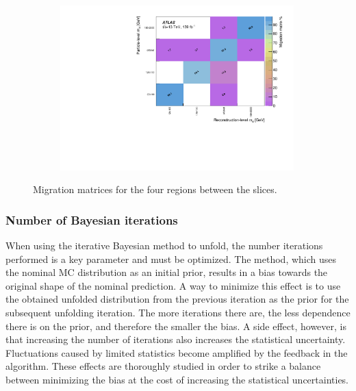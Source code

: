 \begin{figure}[tbh!]
  \centering
  \begin{subfigure}{.85\textwidth}\centering\includegraphics[width = 0.99\textwidth]{Figures/m4l/UnfoldingStudies/v014_matrices/inclusive_vs_m4lMatrix.pdf}\end{subfigure}
 \caption{Migration matrices for the four \mFourL{} regions between the slices. \label{fig:inclvm4lmat}}
\end{figure}

\subsubsection{Number of Bayesian iterations}

When using the iterative Bayesian method to unfold, the number iterations performed is a key parameter and must be optimized. The method, which uses the nominal MC distribution as an initial prior, results in a bias towards the original shape of the nominal prediction. A way to minimize this effect is to use the obtained unfolded distribution from the previous iteration as the prior for the subsequent unfolding iteration. The more iterations there are, the less dependence there is on the prior, and therefore the smaller the bias. A side effect, however, is that increasing the number of iterations also increases the statistical uncertainty. Fluctuations caused by limited statistics become amplified by the feedback in the algorithm. These effects are thoroughly studied in order to strike a balance between minimizing the bias at the cost of increasing the statistical uncertainties.

